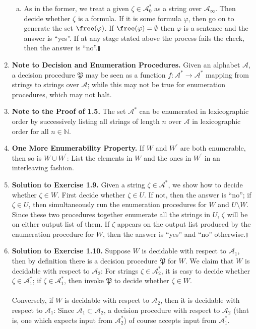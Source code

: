 \begin{enumerate}[1.]
\begin{enumerate}[(a)]
\item As in the former, we treat a given $\zeta \in \mathcal{A}_0^\ast$ as a string over $\mathcal{A}_\infty$. Then decide whether $\zeta$ is a formula. If it is some formula $\varphi$, then go on to generate the set $\free (\varphi)$. If $\free (\varphi) = \emptyset$ then $\varphi$ is a sentence and the answer is ``yes''. If at any stage stated above the process fails the check, then the answer is ``no''.\nolinebreak\hfill$\talloblong$
\end{enumerate}
%
\item \textbf{Note to Decision and Enumeration Procedures.} Given an alphabet $\mathcal{A}$, a decision procedure $\mathfrak{P}$ may be seen as a function $f: \mathcal{A}^* \to \mathcal{A}^*$ mapping from strings to strings over $\mathcal{A}$; while this may not be true for enumeration procedures, which may not halt.
%
\item \textbf{Note to the Proof of 1.5.} The set $\mathcal{A}^\ast$ can be enumerated in lexicographic order by successively listing all strings of length $n$ over $\mathcal{A}$ in lexicographic order for all $n \in \mathbb{N}$.
%
\item \textbf{One More Enumerability Property.} If $W$ and $W^\prime$ are both enumerable, then so is $W \cup W^\prime$: List the elements in $W$ and the ones in $W^\prime$ in an interleaving fashion.
%
\item \textbf{Solution to Exercise 1.9.} Given a string $\zeta \in \mathcal{A}^\ast$, we show how to decide whether $\zeta \in W$. First decide whether $\zeta \in U$. If not, then the answer is ``no''; if $\zeta \in U$, then simultaneously run the enumeration procedures for $W$ and $U \setminus W$. Since these two procedures together enumerate all the strings in $U$, $\zeta$ will be on either output list of them. If $\zeta$ appears on the output list produced by the enumeration procedure for $W$, then the answer is ``yes'' and ``no'' otherwise.\nolinebreak\hfill$\talloblong$
%
\item \textbf{Solution to Exercise 1.10.} Suppose $W$ is decidable with respect to $\mathcal{A}_1$, then by definition there is a decision procedure $\mathfrak{P}$ for $W$. We claim that $W$ is decidable with respect to $\mathcal{A}_2$: For strings $\zeta \in \mathcal{A}_2^*$, it is easy to decide whether $\zeta \in \mathcal{A}_1^*$; if $\zeta \in \mathcal{A}_1^*$, then invoke $\mathfrak{P}$ to decide whether $\zeta \in W$.\\
\ \\
Conversely, if $W$ is decidable with respect to $\mathcal{A}_2$, then it is decidable with respect to $\mathcal{A}_1$: Since $\mathcal{A}_1 \subset \mathcal{A}_2$, a decision procedure with respect to $\mathcal{A}_2$ (that is, one which expects input from $\mathcal{A}_2^*$) of course accepts input from $\mathcal{A}_1^*$.\\

\end{enumerate}
